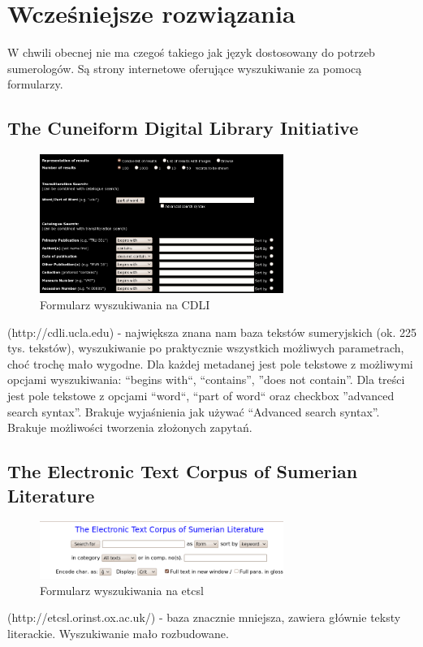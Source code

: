 \chapter{Wcześniejsze rozwiązania}\label{r:losers}
W chwili obecnej nie ma czegoś takiego jak język dostosowany do potrzeb sumerologów. Są strony internetowe oferujące wyszukiwanie za pomocą formularzy.
\section{The Cuneiform Digital Library Initiative}
\begin{figure}[h]
 \centering
 \includegraphics[width=300px]{../diagramy/cdli-search.png}
 \caption{Formularz wyszukiwania na CDLI}
 \label{fig:cdli-search}
\end{figure}

(http://cdli.ucla.edu) - największa znana nam baza tekstów sumeryjskich (ok. 225 tys. tekstów), 
wyszukiwanie po praktycznie wszystkich możliwych parametrach, choć trochę mało wygodne. Dla każdej metadanej jest pole tekstowe z możliwymi opcjami wyszukiwania: ``begins with``, ``contains'', ''does not contain''. Dla treści jest pole tekstowe z opcjami ``word``, ``part of word`` oraz checkbox ''advanced search syntax''. Brakuje wyjaśnienia jak 
używać ``Advanced search syntax''. Brakuje możliwości tworzenia złożonych zapytań.

\section{The Electronic Text Corpus of Sumerian Literature} 
\begin{figure}[h]
 \centering
 \includegraphics[width=300px]{../diagramy/etcsl-search.png}
 \caption{Formularz wyszukiwania na etcsl}
 \label{fig:etcsl-search}
\end{figure}

(http://etcsl.orinst.ox.ac.uk/) - baza znacznie mniejsza, zawiera 
głównie teksty literackie. Wyszukiwanie mało rozbudowane.

